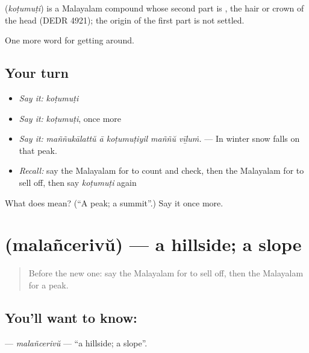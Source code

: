 \begin{cousinweb}
\textbf{} (\emph{koṭumuṭi}) is a Malayalam compound whose second part is , the hair or crown of the head (DEDR 4921); the origin of the first part is not settled.
\end{cousinweb}

\begin{grammarlens}[title={What you've built}]
One more word for getting around.
\end{grammarlens}

\subsection*{Your turn}
\begin{itemize}
\raggedright
  \item \emph{Say it:} \emph{koṭumuṭi}
  \item \emph{Say it:} \emph{koṭumuṭi}, once more
  \item \emph{Say it:} \emph{maññukālattŭ ā koṭumuṭiyil maññŭ vīḻuṁ.} — In winter snow falls on that peak.
  \item \emph{Recall:} say the Malayalam for to count and check, then the Malayalam for to sell off, then say \emph{koṭumuṭi} again
\end{itemize}

\begin{tcolorbox}[breakable,colback=teal!4,colframe=teal!35!black,title={Before you move on}]
What does  mean? (\textquotedblleft{}A peak; a summit\textquotedblright{}.) Say it once more.
\end{tcolorbox}
\section[\texorpdfstring{\ml{മലഞ്ചെരിവ്} (malañcerivŭ)}{മലഞ്ചെരിവ് (malañcerivŭ)}]{ (malañcerivŭ) — a hillside; a slope}

\label{lesson:ML-C495-malancerivu}



\begin{quote}
Before the new one: say the Malayalam for to sell off, then the Malayalam for a peak.
\end{quote}

\subsection*{You'll want to know: }
\textbf{} — \emph{malañcerivŭ} — \textquotedblleft{}a hillside; a slope\textquotedblright{}.

